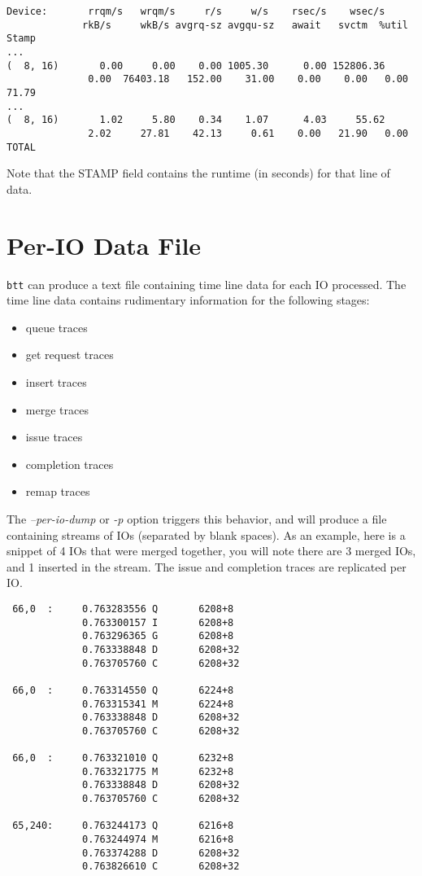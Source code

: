 \documentclass{article}
\begin{document}
\begin{verbatim}
Device:       rrqm/s   wrqm/s     r/s     w/s    rsec/s    wsec/s
             rkB/s     wkB/s avgrq-sz avgqu-sz   await   svctm  %util   Stamp
...
(  8, 16)       0.00     0.00    0.00 1005.30      0.00 152806.36     
              0.00  76403.18   152.00    31.00    0.00    0.00   0.00   71.79
...
(  8, 16)       1.02     5.80    0.34    1.07      4.03     55.62
              2.02     27.81    42.13     0.61    0.00   21.90   0.00   TOTAL
\end{verbatim}

  Note that the STAMP field contains the runtime (in seconds) for that
  line of data.

\newpage\section{\label{sec:per-io}Per-IO Data File}

  \texttt{btt} can produce a text file containing time line data for each
  IO processed. The time line data contains rudimentary information for
  the following stages:

  \begin{itemize}
    \item queue traces
    \item get request traces
    \item insert traces
    \item merge traces
    \item issue traces
    \item completion traces
    \item remap traces
  \end{itemize}

  The \emph{--per-io-dump} or \emph{-p} option triggers this behavior,
  and will produce a file containing streams of IOs (separated by blank
  spaces). As an example, here is a snippet of 4 IOs that were merged
  together, you will note there are 3 merged IOs, and 1 inserted in the
  stream. The issue and completion traces are replicated per IO.

\begin{verbatim}
 66,0  :     0.763283556 Q       6208+8  
             0.763300157 I       6208+8  
             0.763296365 G       6208+8  
             0.763338848 D       6208+32 
             0.763705760 C       6208+32 

 66,0  :     0.763314550 Q       6224+8  
             0.763315341 M       6224+8  
             0.763338848 D       6208+32 
             0.763705760 C       6208+32 

 66,0  :     0.763321010 Q       6232+8  
             0.763321775 M       6232+8  
             0.763338848 D       6208+32 
             0.763705760 C       6208+32 

 65,240:     0.763244173 Q       6216+8  
             0.763244974 M       6216+8  
             0.763374288 D       6208+32 
             0.763826610 C       6208+32 
\end{verbatim}
\end{document}
